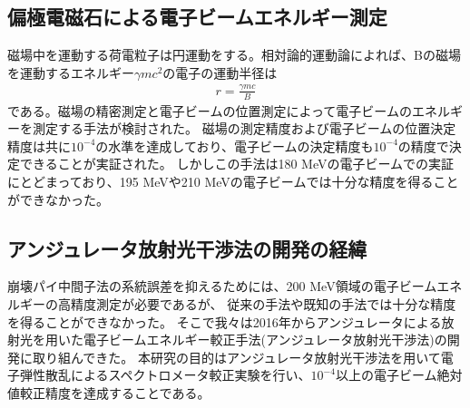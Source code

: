 \documentclass[a4paper,11pt,uplatex]{jsbook}
\begin{document}
\subsection{偏極電磁石による電子ビームエネルギー測定}
磁場中を運動する荷電粒子は円運動をする。相対論的運動論によれば、Bの磁場を運動するエネルギー$\gamma mc^2$の電子の運動半径は
\begin{eqnarray}
  r = \frac{\gamma mc}{B}
\end{eqnarray}
である。磁場の精密測定と電子ビームの位置測定によって電子ビームのエネルギーを測定する手法が検討された。
磁場の測定精度および電子ビームの位置決定精度は共に$10^{-4}$の水準を達成しており、電子ビームの決定精度も$10^{-4}$の精度で決定できることが実証された。
しかしこの手法は180 MeVの電子ビームでの実証にとどまっており、195 MeVや210 MeVの電子ビームでは十分な精度を得ることができなかった\cite{herrmann}。
\subsection{アンジュレータ放射光干渉法の開発の経緯}
崩壊パイ中間子法の系統誤差を抑えるためには、200 MeV領域の電子ビームエネルギーの高精度測定が必要であるが、
従来の手法や既知の手法では十分な精度を得ることができなかった。
そこで我々は2016年からアンジュレータによる放射光を用いた電子ビームエネルギー較正手法(アンジュレータ放射光干渉法)の開発に取り組んできた\cite{klag2018,klag2023}。
本研究の目的はアンジュレータ放射光干渉法を用いて電子弾性散乱によるスペクトロメータ較正実験を行い、$10^{-4}$以上の電子ビーム絶対値較正精度を達成することである。

\end{document}
